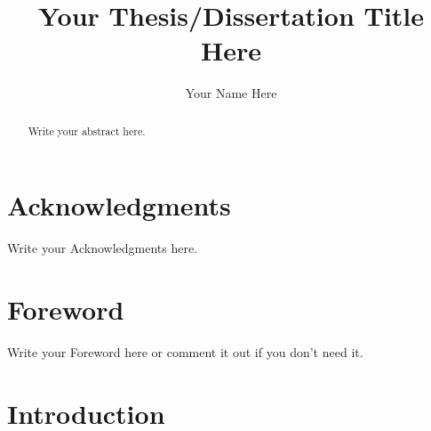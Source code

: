 \documentclass{TUT}
\author{Your Name Here}
\title{Your Thesis/Dissertation Title Here}
\begin{document}


%
\begin{abstract}
  Write your abstract here.
\end{abstract}


\maketitle


\chapter*{Acknowledgments}
\pagestyle{plain}
\setcounter{page}{2}

Write your Acknowledgments here.


\chapter*{Foreword}

Write your Foreword here or comment it out if you don't need it.


\tableofcontents
\listoftables
\listoffigures


\chapter{Introduction}
\pagestyle{headings}
\end{document}
